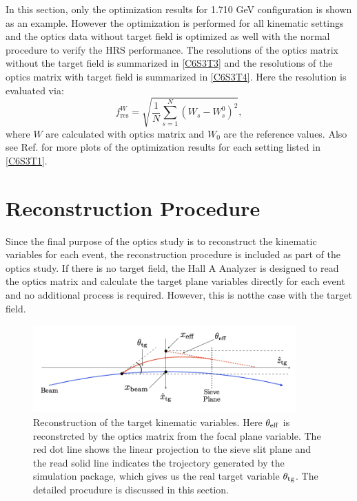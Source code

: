 In this section, only the optimization results for 1.710 GeV configuration is shown as an example. However the optimization is performed for all kinematic settings and the optics data without target field is optimized as well with the normal procedure to verify the HRS performance. The resolutions of the optics matrix without the target field is summarized in \cref{C6S3T3} and the resolutions of the optics matrix with target field is summarized in \cref{C6S3T4}. Here the resolution is evaluated via:
\begin{equation} \label{C6S3E6}
f_{\mathrm{res}}^W = \sqrt{\frac{1}{N}\sum_{s=1}^N(W_s-W_s^0)^2},
\end{equation}
where $W$ are calculated with optics matrix and $W_0$ are the reference values. Also see Ref. \cite{OPTICSWIKI} for more plots of the optimization results for each setting listed in \cref{C6S3T1}.

\section{Reconstruction Procedure}
\label{C6S4}

Since the final purpose of the optics study is to reconstruct the kinematic variables for each event, the reconstruction procedure is included as part of the optics study. If there is no target field, the Hall A Analyzer is designed to read the optics matrix and calculate the target plane variables directly for each event \cite{Hansen2015} and no additional process is required. However, this is notthe case with the target field.

\begin{figure}[b!]
  \centering
  \includegraphics[width=0.9\textwidth]{figs/reconstruction.png}
  \caption[Reconstruction of the target kinematic variables.]{Reconstruction of the target kinematic variables. Here $\theta_{\mathrm{eff}}$ is reconstrcted by the optics matrix from the focal plane variable. The red dot line shows the linear projection to the sieve slit plane and the read solid line indicates the trojectory generated by the simulation package, which gives us the real target variable $\theta_{\mathrm{tg}}$. The detailed procudure is discussed in this section.  \label{C6S4F1}}
\end{figure}

